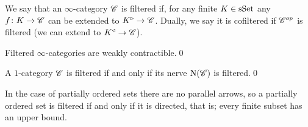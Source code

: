 \documentclass[../../thesis.tex]{subfiles}
\begin{document}
\begin{definition}
    We say that an $\infty$-category $\mathscr{C}$ is filtered if, for any finite $K\in \mathrm{sSet}$ any $f\colon K\to \mathscr{C}$ can be extended to $K^{\triangleright} \to \mathscr{C}$.
    Dually, we say it is cofiltered if $\mathscr{C}^{op}$ is filtered (we can extend to $K^{\triangleleft} \to \mathscr{C}$).
\end{definition}
\begin{proposition}\label{5.3.1.20}
    Filtered $\infty$-categories are weakly contractible.\qed
\end{proposition}
\begin{proposition}\label{NerveFilter}
    A $1$-category $\mathscr{C}$ is filtered if and only if its nerve $\mathrm{N}(\mathscr{C})$ is filtered.\qed
\end{proposition}
\begin{remark}\label{filteredposet}
    In the case of partially ordered sets there are no parallel arrows, so a partially ordered set is filtered if and only if it is directed, that is; every finite subset has an upper bound.
\end{remark}
\end{document}
